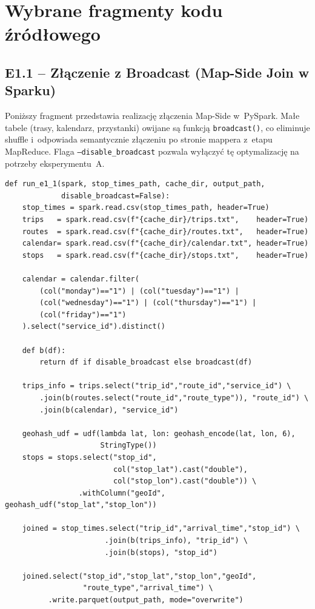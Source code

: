 \documentclass{labreport}
\begin{document}
\section{Wybrane fragmenty kodu źródłowego}

\subsection{E1.1 -- Złączenie z Broadcast (Map-Side Join w Sparku)}

Poniższy fragment przedstawia realizację złączenia Map-Side w~PySpark. Małe tabele (trasy, kalendarz, przystanki) owijane są funkcją \texttt{broadcast()}, co eliminuje shuffle i~odpowiada semantycznie złączeniu po stronie mappera z~etapu MapReduce. Flaga \texttt{--disable\_broadcast} pozwala wyłączyć tę optymalizację na potrzeby eksperymentu~A.

\begin{verbatim}
def run_e1_1(spark, stop_times_path, cache_dir, output_path,
             disable_broadcast=False):
    stop_times = spark.read.csv(stop_times_path, header=True)
    trips   = spark.read.csv(f"{cache_dir}/trips.txt",    header=True)
    routes  = spark.read.csv(f"{cache_dir}/routes.txt",   header=True)
    calendar= spark.read.csv(f"{cache_dir}/calendar.txt", header=True)
    stops   = spark.read.csv(f"{cache_dir}/stops.txt",    header=True)

    calendar = calendar.filter(
        (col("monday")=="1") | (col("tuesday")=="1") |
        (col("wednesday")=="1") | (col("thursday")=="1") |
        (col("friday")=="1")
    ).select("service_id").distinct()

    def b(df):
        return df if disable_broadcast else broadcast(df)

    trips_info = trips.select("trip_id","route_id","service_id") \
        .join(b(routes.select("route_id","route_type")), "route_id") \
        .join(b(calendar), "service_id")

    geohash_udf = udf(lambda lat, lon: geohash_encode(lat, lon, 6),
                      StringType())
    stops = stops.select("stop_id",
                         col("stop_lat").cast("double"),
                         col("stop_lon").cast("double")) \
                 .withColumn("geoId", geohash_udf("stop_lat","stop_lon"))

    joined = stop_times.select("trip_id","arrival_time","stop_id") \
                       .join(b(trips_info), "trip_id") \
                       .join(b(stops), "stop_id")

    joined.select("stop_id","stop_lat","stop_lon","geoId",
                  "route_type","arrival_time") \
          .write.parquet(output_path, mode="overwrite")
\end{verbatim}
\end{document}
